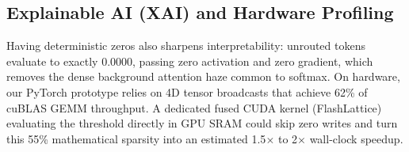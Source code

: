 \subsection{Explainable AI (XAI) and Hardware Profiling}
Having deterministic zeros also sharpens interpretability: unrouted tokens evaluate to exactly $0.0000$, passing zero activation and zero gradient, which removes the dense background attention haze common to softmax. On hardware, our PyTorch prototype relies on 4D tensor broadcasts that achieve 62\% of cuBLAS GEMM throughput. A dedicated fused CUDA kernel (FlashLattice) evaluating the threshold directly in GPU SRAM could skip zero writes and turn this 55\% mathematical sparsity into an estimated 1.5$\times$ to 2$\times$ wall-clock speedup.
